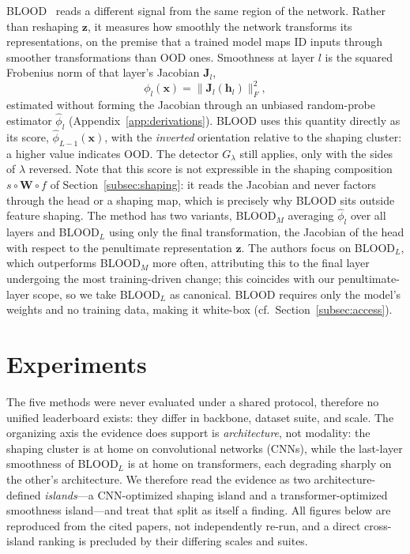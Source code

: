 \documentclass[a4paper]{article}
\begin{document}
BLOOD~\citep{blood} reads a different signal from the same region of the network.
Rather than reshaping $\mathbf{z}$, it measures how smoothly the network transforms
its representations, on the premise that a trained model maps ID inputs through
smoother transformations than OOD ones. Smoothness at layer $l$ is the squared
Frobenius norm of that layer's Jacobian $\mathbf{J}_l$,
\begin{equation}
\label{eq:blood}
\phi_l(\mathbf{x}) = \big\| \mathbf{J}_l(\mathbf{h}_l) \big\|_F^{2},
\end{equation}
estimated without forming the Jacobian through an unbiased random-probe estimator
$\hat{\phi}_l$ (Appendix~\ref{app:derivations}). BLOOD uses this
quantity directly as its score, $\hat{\phi}_{L-1}(\mathbf{x})$, with
the \emph{inverted} orientation relative to the shaping cluster: a higher value
indicates OOD. The detector $G_\lambda$ still applies, only with the sides of
$\lambda$ reversed. Note that this score is not expressible in the
shaping composition $s \circ \mathbf{W} \circ f$ of Section~\ref{subsec:shaping}: it
reads the Jacobian and never factors through the head or a shaping map, which is
precisely why BLOOD sits outside feature shaping. The method has two variants,
BLOOD$_M$ averaging $\hat{\phi}_l$ over all layers and BLOOD$_L$ using only the final
transformation, the Jacobian of the head with respect to the penultimate
representation $\mathbf{z}$. The authors focus on BLOOD$_L$, which outperforms
BLOOD$_M$ more often, attributing this to the final layer undergoing the most
training-driven change; this coincides with our penultimate-layer scope, so we take
BLOOD$_L$ as canonical. BLOOD requires only the model's weights and no training data,
making it white-box (cf.\ Section~\ref{subsec:access}).



\section{Experiments}
\label{sec:experiments}

The five methods were never evaluated under a shared protocol, therefore no unified
leaderboard exists: they differ in backbone, dataset suite, and scale. The organizing
axis the evidence does support is \emph{architecture}, not modality: the shaping
cluster is at home on convolutional networks (CNNs), while the last-layer smoothness of
BLOOD$_L$ is at home on transformers, each degrading sharply on the other's
architecture. We therefore read the evidence as two architecture-defined
\emph{islands}---a CNN-optimized shaping island and a transformer-optimized smoothness
island---and treat that split as itself a finding. All figures below are reproduced from
the cited papers, not independently re-run, and a direct cross-island ranking is
precluded by their differing scales and suites.
\end{document}
